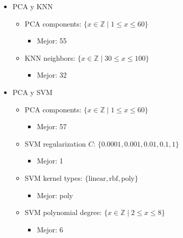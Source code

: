 \documentclass[journal]{IEEEtran}
\begin{document}
\begin{otherlanguage}{english}
\begin{itemize}
        \item PCA y KNN
        \begin{itemize}
                \item PCA components: \( \{ x \in \mathbb{Z} \mid 1 \leq x \leq 60 \} \)
                \begin{itemize}
                        \item Mejor: 55
                \end{itemize}
                \item KNN neighbors: \( \{ x \in \mathbb{Z} \mid 30 \leq x \leq 100 \} \)
                \begin{itemize}
                        \item Mejor: 32
                \end{itemize}
        \end{itemize}

        \item PCA y SVM
        \begin{itemize}
                \item PCA components: \( \{ x \in \mathbb{Z} \mid 1 \leq x \leq 60 \} \)
                \begin{itemize}
                        \item Mejor: 57
                \end{itemize}
                \item SVM regularization \( C \): \( \{ 0.0001, 0.001, 0.01, 0.1, 1 \} \)
                \begin{itemize}
                        \item Mejor: 1
                \end{itemize}
                \item SVM kernel types: \( \{ \text{linear}, \text{rbf}, \text{poly} \} \)
                \begin{itemize}
                        \item Mejor: poly
                \end{itemize}
                \item SVM polynomial degree: \( \{ x \in \mathbb{Z} \mid 2 \leq x \leq 8 \} \)
                \begin{itemize}
                        \item Mejor: 6
                \end{itemize}
        \end{itemize}


\end{itemize}
\end{otherlanguage}
\end{document}
